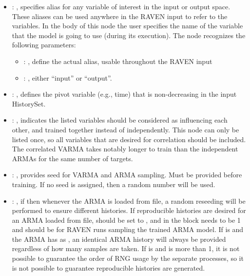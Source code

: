 \begin{itemize}
    \item {}: , 
      specifies alias for         any variable of interest in the input or output space. These
      aliases can be used anywhere in the RAVEN input to         refer to the variables. In the body
      of this node the user specifies the name of the variable that the model is going to use
      (during its execution).
      The  node recognizes the following parameters:
        \begin{itemize}
          \item {}: , 
            define the actual alias, usable throughout the RAVEN input
          \item {}: , 
            either ``input'' or ``output''.
      \end{itemize}

    \item {}: , 
      defines the pivot variable (e.g., time) that is non-decreasing in
      the input HistorySet.

    \item {}: , 
      indicates the listed variables                                                    should be
      considered as influencing each other, and trained together instead of independently.  This
      node                                                    can only be listed once, so all
      variables that are desired for correlation should be included.  \nb The
      correlated VARMA takes notably longer to train than the independent ARMAs for the same number
      of targets.

    \item {}: , 
      provides seed for VARMA and ARMA sampling.
      Must be provided before training. If no seed is assigned,
      then a random number will be used.

    \item {}: , 
      if  then whenever the ARMA is loaded from file, a
      random reseeding will be performed to ensure different histories. \nb If
      reproducible histories are desired for an ARMA loaded from file,
       should be set to , and in the
       block  needs to be 1
      and  should be
       for RAVEN runs sampling the trained ARMA model.
      If  is  and the ARMA has
       as , an identical ARMA history
      will always be provided regardless of how many samples are taken.
      If  is  and 
      is more than 1, it is not possible to guarantee the order of RNG usage by
      the separate processes, so it is not possible to guarantee reproducible
      histories are generated.


\end{itemize}
